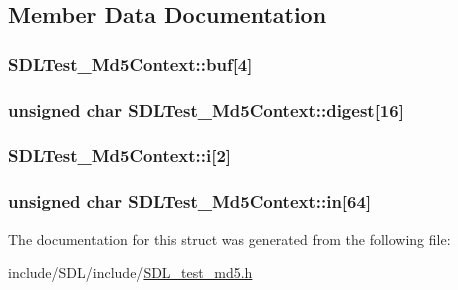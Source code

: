\subsection{Member Data Documentation}
\hypertarget{struct_s_d_l_test___md5_context_a061f0cead7ec49ac4c5baf0bbd9c13a7}{
\subsubsection[{buf}]{ S\-D\-L\-Test\-\_\-\-Md5\-Context\-::buf\mbox{[}4\mbox{]}}}\label{struct_s_d_l_test___md5_context_a061f0cead7ec49ac4c5baf0bbd9c13a7}
\hypertarget{struct_s_d_l_test___md5_context_ab29079997a9f35e5d52c2aac3ad28f90}{
\subsubsection[{digest}]{\setlength{\rightskip}{0pt plus 5cm}unsigned char S\-D\-L\-Test\-\_\-\-Md5\-Context\-::digest\mbox{[}16\mbox{]}}}\label{struct_s_d_l_test___md5_context_ab29079997a9f35e5d52c2aac3ad28f90}
\hypertarget{struct_s_d_l_test___md5_context_a95b3d5fd74fd1b7a27bf96f3bb32beb4}{
\subsubsection[{i}]{ S\-D\-L\-Test\-\_\-\-Md5\-Context\-::i\mbox{[}2\mbox{]}}}\label{struct_s_d_l_test___md5_context_a95b3d5fd74fd1b7a27bf96f3bb32beb4}
\hypertarget{struct_s_d_l_test___md5_context_a337638ef799dc0ad9397ea9b175ea388}{
\subsubsection[{in}]{\setlength{\rightskip}{0pt plus 5cm}unsigned char S\-D\-L\-Test\-\_\-\-Md5\-Context\-::in\mbox{[}64\mbox{]}}}\label{struct_s_d_l_test___md5_context_a337638ef799dc0ad9397ea9b175ea388}


The documentation for this struct was generated from the following file\-:\begin{DoxyCompactItemize}
\item 
include/\-S\-D\-L/include/\hyperlink{_s_d_l__test__md5_8h}{S\-D\-L\-\_\-test\-\_\-md5.\-h}\end{DoxyCompactItemize}
